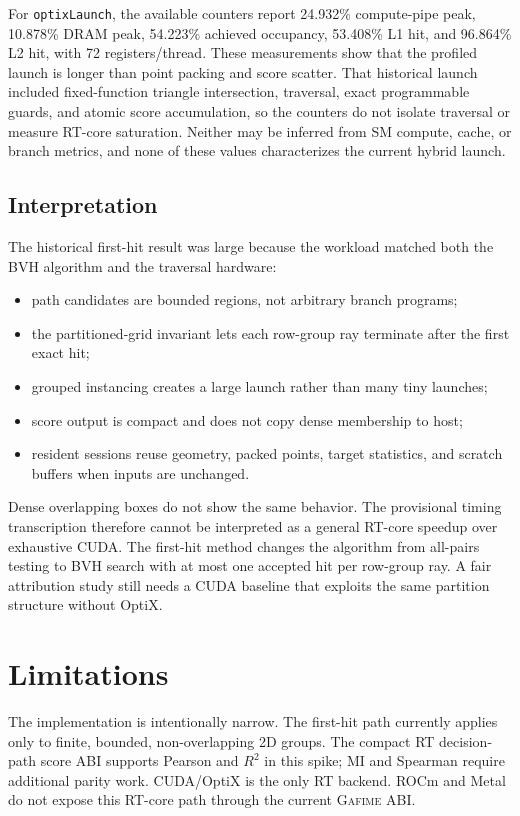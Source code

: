 \documentclass[11pt]{article}
\newcommand{\gafime}{\textsc{Gafime}\xspace}
\begin{document}
For \texttt{optixLaunch}, the available counters report 24.932\% compute-pipe
peak, 10.878\% DRAM peak, 54.223\% achieved occupancy, 53.408\% L1 hit, and
96.864\% L2 hit, with 72 registers/thread. These measurements show that the
profiled launch is longer than point packing and
score scatter. That historical launch included fixed-function triangle
intersection, traversal, exact programmable guards, and atomic score
accumulation, so the counters do not isolate traversal or measure RT-core
saturation. Neither may be inferred from SM compute, cache, or branch metrics,
and none of these values characterizes the current hybrid launch.

\subsection{Interpretation}

The historical first-hit result was large because the workload matched both the
BVH algorithm and the traversal hardware:

\begin{itemize}
  \item path candidates are bounded regions, not arbitrary branch programs;
  \item the partitioned-grid invariant lets each row-group ray terminate after
  the first exact hit;
  \item grouped instancing creates a large launch rather than many tiny
  launches;
  \item score output is compact and does not copy dense membership to host;
  \item resident sessions reuse geometry, packed points, target statistics, and
  scratch buffers when inputs are unchanged.
\end{itemize}

Dense overlapping boxes do not show the same behavior. The provisional timing
transcription therefore cannot be interpreted as a general RT-core speedup over
exhaustive CUDA. The
first-hit method changes the algorithm from all-pairs testing to BVH search with
at most one accepted hit per row-group ray. A fair attribution study still
needs a CUDA baseline that exploits the same partition structure without
OptiX.

\section{Limitations}

The implementation is intentionally narrow. The first-hit path currently
applies only to finite, bounded, non-overlapping 2D groups.
The compact RT
decision-path score ABI supports Pearson and $R^2$ in this spike; MI and
Spearman require additional parity work. CUDA/OptiX is the only RT backend.
ROCm and Metal do not expose this RT-core path through the current \gafime ABI.
\end{document}
